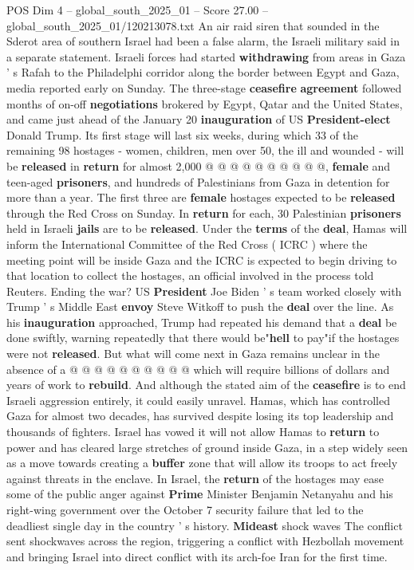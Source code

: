 \begin{textsample}{POS Dim 4 – global\_south\_2025\_01 – Score 27.00 – global\_south\_2025\_01/120213078.txt}
An air raid siren that sounded in the Sderot area of southern Israel had been a false alarm, the Israeli military said in a separate statement.
Israeli forces had started \textbf{withdrawing} from areas in Gaza ' s Rafah to the Philadelphi corridor along the border between Egypt and Gaza, media reported early on Sunday.
The three-stage \textbf{ceasefire} \textbf{agreement} followed months of on-off \textbf{negotiations} brokered by Egypt, Qatar and the United States, and came just ahead of the January 20 \textbf{inauguration} of US \textbf{President-elect} Donald Trump.
Its first stage will last six weeks, during which 33 of the remaining 98 hostages - women, children, men over 50, the ill and wounded - will be \textbf{released} in \textbf{return} for almost 2,000 @ @ @ @ @ @ @ @ @ @, \textbf{female} and teen-aged \textbf{prisoners}, and hundreds of Palestinians from Gaza in detention for more than a year.
The first three are \textbf{female} hostages expected to be \textbf{released} through the Red Cross on Sunday.
In \textbf{return} for each, 30 Palestinian \textbf{prisoners} held in Israeli \textbf{jails} are to be \textbf{released}.
Under the \textbf{terms} of the \textbf{deal}, Hamas will inform the International Committee of the Red Cross ( ICRC ) where the meeting point will be inside Gaza and the ICRC is expected to begin driving to that location to collect the hostages, an official involved in the process told Reuters.
Ending the war?
US \textbf{President} Joe Biden ' s team worked closely with Trump ' s Middle East \textbf{envoy} Steve Witkoff to push the \textbf{deal} over the line.
As his \textbf{inauguration} approached, Trump had repeated his demand that a \textbf{deal} be done swiftly, warning repeatedly that there would be"\textbf{hell} to pay"if the hostages were not \textbf{released}.
But what will come next in Gaza remains unclear in the absence of a @ @ @ @ @ @ @ @ @ @ which will require billions of dollars and years of work to \textbf{rebuild}.
And although the stated aim of the \textbf{ceasefire} is to end Israeli aggression entirely, it could easily unravel.
Hamas, which has controlled Gaza for almost two decades, has survived despite losing its top leadership and thousands of fighters.
Israel has vowed it will not allow Hamas to \textbf{return} to power and has cleared large stretches of ground inside Gaza, in a step widely seen as a move towards creating a \textbf{buffer} zone that will allow its troops to act freely against threats in the enclave.
In Israel, the \textbf{return} of the hostages may ease some of the public anger against \textbf{Prime} Minister Benjamin Netanyahu and his right-wing government over the October 7 security failure that led to the deadliest single day in the country ' s history. \textbf{Mideast} shock waves The conflict sent shockwaves across the region, triggering a conflict with Hezbollah movement and bringing Israel into direct conflict with its arch-foe Iran for the first time.

\end{textsample}
